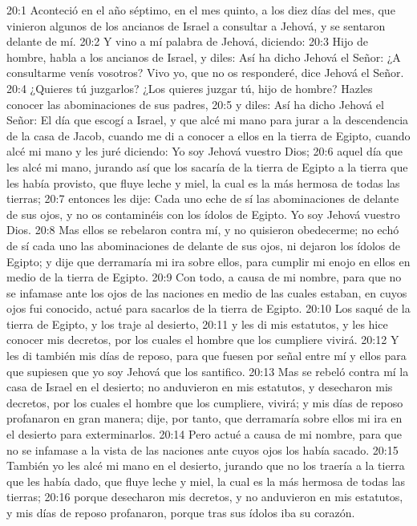 20:1 Aconteció en el año séptimo, en el mes quinto, a los diez días del mes, que vinieron algunos de los ancianos de Israel a consultar a Jehová, y se sentaron delante de mí.   
20:2 Y vino a mí palabra de Jehová, diciendo:   
20:3 Hijo de hombre, habla a los ancianos de Israel, y diles: Así ha dicho Jehová el Señor: ¿A consultarme venís vosotros? Vivo yo, que no os responderé, dice Jehová el Señor.   
20:4 ¿Quieres tú juzgarlos? ¿Los quieres juzgar tú, hijo de hombre? Hazles conocer las abominaciones de sus padres, 
20:5 y diles: Así ha dicho Jehová el Señor: El día que escogí a Israel, y que alcé mi mano para jurar a la descendencia de la casa de Jacob, cuando me di a conocer a ellos en la tierra de Egipto, cuando alcé mi mano y les juré diciendo: Yo soy Jehová vuestro Dios;   
20:6 aquel día que les alcé mi mano, jurando así que los sacaría de la tierra de Egipto a la tierra que les había provisto, que fluye leche y miel, la cual es la más hermosa de todas las tierras; 
20:7 entonces les dije: Cada uno eche de sí las abominaciones de delante de sus ojos, y no os contaminéis con los ídolos de Egipto. Yo soy Jehová vuestro Dios.   
20:8 Mas ellos se rebelaron contra mí, y no quisieron obedecerme; no echó de sí cada uno las abominaciones de delante de sus ojos, ni dejaron los ídolos de Egipto; y dije que derramaría mi ira sobre ellos, para cumplir mi enojo en ellos en medio de la tierra de Egipto.   
20:9 Con todo, a causa de mi nombre, para que no se infamase ante los ojos de las naciones en medio de las cuales estaban, en cuyos ojos fui conocido, actué para sacarlos de la tierra de Egipto.   
20:10 Los saqué de la tierra de Egipto, y los traje al desierto,   
20:11 y les di mis estatutos, y les hice conocer mis decretos, por los cuales el hombre que los cumpliere vivirá.   
20:12 Y les di también mis días de reposo, para que fuesen por señal entre mí y ellos para que supiesen que yo soy Jehová que los santifico.   
20:13 Mas se rebeló contra mí la casa de Israel en el desierto; no anduvieron en mis estatutos, y desecharon mis decretos, por los cuales el hombre que los cumpliere, vivirá; y mis días de reposo profanaron en gran manera; dije, por tanto, que derramaría sobre ellos mi ira en el desierto para exterminarlos.   
20:14 Pero actué a causa de mi nombre, para que no se infamase a la vista de las naciones ante cuyos ojos los había sacado.   
20:15 También yo les alcé mi mano en el desierto, jurando que no los traería a la tierra que les había dado, que fluye leche y miel, la cual es la más hermosa de todas las tierras;   
20:16 porque desecharon mis decretos, y no anduvieron en mis estatutos, y mis días de reposo profanaron, porque tras sus ídolos iba su corazón.   
